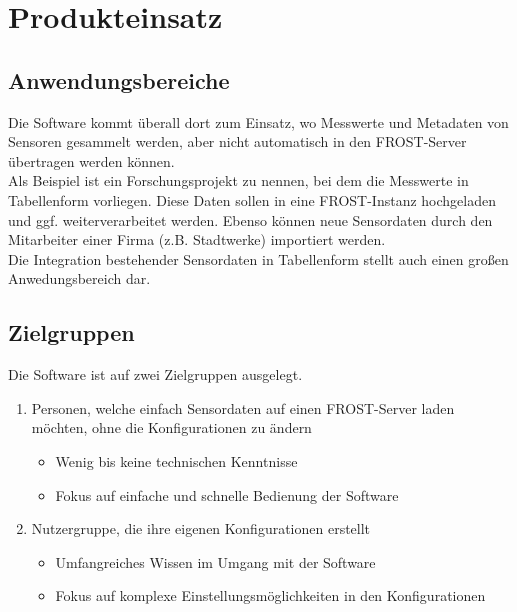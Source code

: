 \documentclass[a4paper, 12 pt]{article}
\begin{document}
\pagebreak
\section{Produkteinsatz}
\subsection{Anwendungsbereiche}
Die Software kommt überall dort zum Einsatz, wo Messwerte und Metadaten von Sensoren gesammelt werden, aber nicht automatisch in den FROST-Server übertragen werden können.\\
Als Beispiel ist ein Forschungsprojekt zu nennen, bei dem die Messwerte in Tabellenform vorliegen. Diese Daten sollen in eine FROST-Instanz hochgeladen und ggf. weiterverarbeitet werden. Ebenso können neue Sensordaten durch den Mitarbeiter einer Firma (z.B. Stadtwerke) importiert werden.\\
Die Integration bestehender Sensordaten in Tabellenform stellt auch einen großen Anwedungsbereich dar.
	

	\subsection{Zielgruppen}
	Die Software ist auf zwei Zielgruppen ausgelegt.\\
	\begin{enumerate}
		\item Personen, welche einfach Sensordaten auf einen FROST-Server laden möchten, ohne die Konfigurationen zu ändern
		
		\begin{itemize}
			\item Wenig bis keine technischen Kenntnisse
			\item Fokus auf einfache und schnelle Bedienung der Software
		\end{itemize}
		
		\item Nutzergruppe, die ihre eigenen Konfigurationen erstellt
		\begin{itemize}
			\item Umfangreiches Wissen im Umgang mit der Software
			\item Fokus auf komplexe Einstellungsmöglichkeiten in den Konfigurationen
		\end{itemize} 
	\end{enumerate}
	
\end{document}
